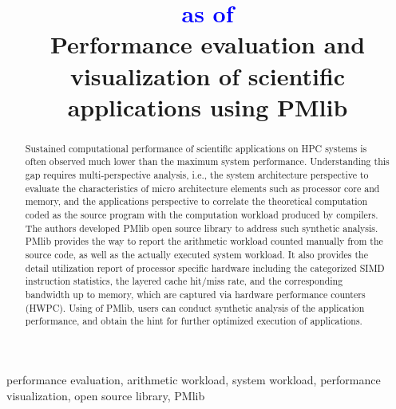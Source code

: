 \documentclass[conference]{IEEEtran}
\begin{document}
\title{
\textcolor{blue}{as of \DTMnow} \\
Performance evaluation and visualization of scientific applications using PMlib
}

\author{
\and
{}
}

\maketitle

\begin{abstract}
Sustained computational performance of scientific applications on HPC systems
is often observed much lower than the maximum system performance.
Understanding this gap requires multi-perspective analysis, i.e., the system
architecture perspective to evaluate the characteristics of micro architecture
elements such as processor core and memory, and the applications perspective
to correlate the theoretical computation coded as the source program with the
computation workload produced by compilers.
The authors developed PMlib open source library to address such synthetic analysis.
PMlib provides the way to report the arithmetic workload counted manually from
the source code, as well as the actually executed system workload.
It also provides the detail utilization report of processor specific hardware
including the categorized SIMD instruction statistics, the layered cache
hit/miss rate, and the corresponding bandwidth up to memory,
which are captured via hardware performance counters (HWPC).
Using of PMlib, users can conduct synthetic analysis of the application
performance, and obtain the hint for further optimized execution of applications.
\end{abstract}

\begin{IEEEkeywords}
performance evaluation,
arithmetic workload,
system workload,
performance visualization,
open source library,
PMlib
\end{IEEEkeywords}
\end{document}

